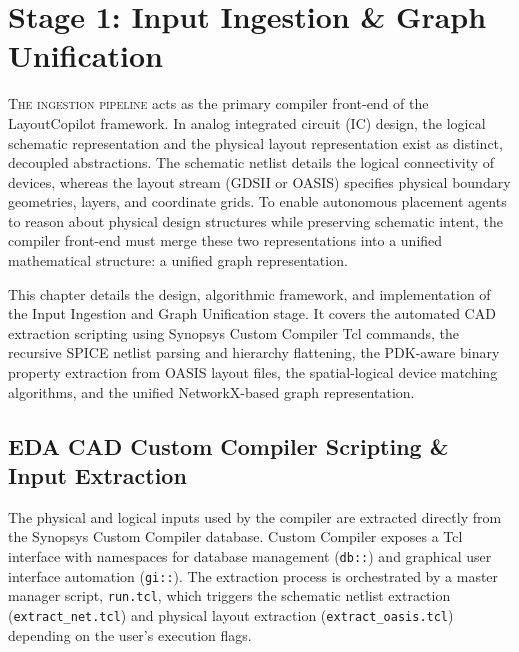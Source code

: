 
\chapter{Stage 1: Input Ingestion \& Graph Unification}
\label{ch:input_parser}

\lettrine[lines=3]{T}{he ingestion pipeline} acts as the primary compiler front-end of the LayoutCopilot framework. In analog integrated circuit (IC) design, the logical schematic representation and the physical layout representation exist as distinct, decoupled abstractions. The schematic netlist details the logical connectivity of devices, whereas the layout stream (GDSII or OASIS) specifies physical boundary geometries, layers, and coordinate grids. To enable autonomous placement agents to reason about physical design structures while preserving schematic intent, the compiler front-end must merge these two representations into a unified mathematical structure: a unified graph representation.

This chapter details the design, algorithmic framework, and implementation of the Input Ingestion and Graph Unification stage. It covers the automated CAD extraction scripting using Synopsys Custom Compiler Tcl commands, the recursive SPICE netlist parsing and hierarchy flattening, the PDK-aware binary property extraction from OASIS layout files, the spatial-logical device matching algorithms, and the unified NetworkX-based graph representation.

\section[CAD Tool Extraction]{EDA CAD Custom Compiler Scripting \& Input Extraction}
\label{sec:cad_extraction}

The physical and logical inputs used by the compiler are extracted directly from the Synopsys Custom Compiler database. Custom Compiler exposes a Tcl interface with namespaces for database management (\texttt{db::}) and graphical user interface automation (\texttt{gi::}). The extraction process is orchestrated by a master manager script, \texttt{run.tcl}, which triggers the schematic netlist extraction (\texttt{extract\_net.tcl}) and physical layout extraction (\texttt{extract\_oasis.tcl}) depending on the user's execution flags.

